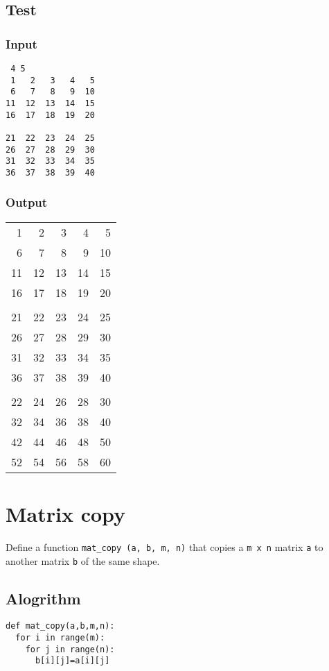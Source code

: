 \documentclass[11pt]{article}
\begin{document}
\subsection*{Test}
\label{sec-4-4}
\subsubsection*{Input}
\label{sec-4-4-1}
\begin{verbatim}
 4 5
 1   2   3   4   5 
 6   7   8   9  10 
11  12  13  14  15 
16  17  18  19  20 

21  22  23  24  25 
26  27  28  29  30 
31  32  33  34  35 
36  37  38  39  40
\end{verbatim}

\subsubsection*{Output}
\label{sec-4-4-2}

\begin{center}
\begin{tabular}{rrrrr}
1 & 2 & 3 & 4 & 5\\
6 & 7 & 8 & 9 & 10\\
11 & 12 & 13 & 14 & 15\\
16 & 17 & 18 & 19 & 20\\
 &  &  &  & \\
21 & 22 & 23 & 24 & 25\\
26 & 27 & 28 & 29 & 30\\
31 & 32 & 33 & 34 & 35\\
36 & 37 & 38 & 39 & 40\\
 &  &  &  & \\
22 & 24 & 26 & 28 & 30\\
32 & 34 & 36 & 38 & 40\\
42 & 44 & 46 & 48 & 50\\
52 & 54 & 56 & 58 & 60\\
\end{tabular}
\end{center}

\section{Matrix copy}
\label{sec-5}
Define a function \texttt{mat\_copy (a, b, m, n)} that copies a
\texttt{m x n} matrix \texttt{a} to another matrix \texttt{b} of the same
shape. 
\linespread{1}
\linespread{1.2}
\subsection*{Alogrithm}
\label{sec-5-1}
\begin{verbatim}
def mat_copy(a,b,m,n):
  for i in range(m):
    for j in range(n):
      b[i][j]=a[i][j]
\end{verbatim}
\end{document}
